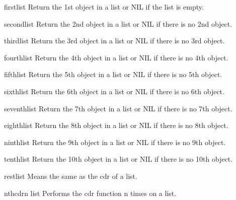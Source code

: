 \documentclass[10pt,english]{book}
\begin{document}
\begin{accessor}{first}{list}
  Return the 1st object in a list or NIL if the list is empty.
\end{accessor}

\begin{accessor}{second}{list}
  Return the 2nd object in a list or NIL if there is no 2nd object.
\end{accessor}

\begin{accessor}{third}{list}
  Return the 3rd object in a list or NIL if there is no 3rd object.
\end{accessor}

\begin{accessor}{fourth}{list}
  Return the 4th object in a list or NIL if there is no 4th object.
\end{accessor}

\begin{accessor}{fifth}{list}
  Return the 5th object in a list or NIL if there is no 5th object.
\end{accessor}

\begin{accessor}{sixth}{list}
  Return the 6th object in a list or NIL if there is no 6th object.
\end{accessor}

\begin{accessor}{seventh}{list}
  Return the 7th object in a list or NIL if there is no 7th object.
\end{accessor}

\begin{accessor}{eighth}{list}
  Return the 8th object in a list or NIL if there is no 8th object.
\end{accessor}

\begin{accessor}{ninth}{list}
  Return the 9th object in a list or NIL if there is no 9th object.
\end{accessor}

\begin{accessor}{tenth}{list}
  Return the 10th object in a list or NIL if there is no 10th object.
\end{accessor}

\begin{accessor}{rest}{list}
  Means the same as the cdr of a list.
\end{accessor}

\begin{function}{nthcdr}{n list}
  Performs the cdr function n times on a list.
\end{function}
\end{document}
